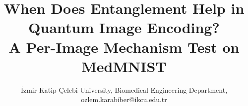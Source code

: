 \documentclass[conference,compsoc]{IEEEtran}
\begin{document}
\title{When Does Entanglement Help in Quantum Image Encoding?\\A Per-Image Mechanism Test on MedMNIST}

\author{
İzmir Katip Çelebi University, Biomedical Engineering Department, ozlem.karabiber@ikcu.edu.tr
}








\maketitle
\end{document}
